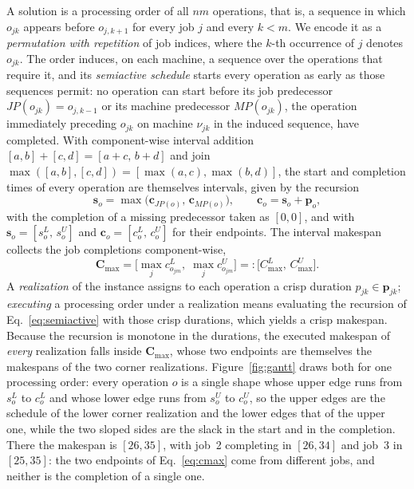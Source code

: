 \documentclass[preprint,authoryear,12pt]{elsarticle}
\newcommand{\Cmax}{\mathbf{C}_{\max}}
\theoremstyle{definition}
\theoremstyle{remark}
\begin{document}
A solution is a processing order of all $nm$ operations, that is, a
sequence in which $o_{jk}$ appears before $o_{j,k+1}$ for every job
$j$ and every $k<m$. We encode it as a \emph{permutation with
repetition} of job indices, where the $k$-th occurrence of $j$
denotes $o_{jk}$. The order induces, on each machine, a sequence over
the operations that require it, and its \emph{semiactive schedule}
starts every operation as early as those sequences permit: no
operation can start before its job predecessor $JP(o_{jk})=o_{j,k-1}$
or its machine predecessor $MP(o_{jk})$, the operation immediately
preceding $o_{jk}$ on machine $\nu_{jk}$ in the induced sequence,
have completed. With component-wise interval
addition $[a,b]+[c,d]=[a+c,\,b+d]$ and join
$\max([a,b],[c,d])=[\max(a,c),\max(b,d)]$, the start and completion
times of every operation are themselves intervals, given by the
recursion
\begin{equation}
\mathbf{s}_{o}=\max\!\big(\mathbf{c}_{JP(o)},\,\mathbf{c}_{MP(o)}\big),
\qquad
\mathbf{c}_{o}=\mathbf{s}_{o}+\mathbf{p}_{o},
\label{eq:semiactive}
\end{equation}
with the completion of a missing predecessor taken as $[0,0]$, and
with $\mathbf{s}_{o}=[s^{L}_{o},\,s^{U}_{o}]$ and
$\mathbf{c}_{o}=[c^{L}_{o},\,c^{U}_{o}]$ for their endpoints.
The interval makespan collects the job completions component-wise,
\begin{equation}
\Cmax=\Big[\max_{j} c^{L}_{o_{jm}},\;\max_{j} c^{U}_{o_{jm}}\Big]
=:\big[C^{L}_{\max},\,C^{U}_{\max}\big].
\label{eq:cmax}
\end{equation}
A \emph{realization} of the instance assigns to each operation a
crisp duration $p_{jk}\in\mathbf{p}_{jk}$; \emph{executing} a
processing order under a realization means evaluating the recursion
of Eq.~\eqref{eq:semiactive} with those crisp durations, which yields
a crisp makespan. Because the recursion is monotone in the durations,
the executed makespan of \emph{every} realization falls inside
$\Cmax$, whose two endpoints are themselves the makespans of the two
corner realizations. Figure~\ref{fig:gantt} draws both for one
processing order: every operation $o$ is a single shape whose upper
edge runs from $s^{L}_{o}$ to $c^{L}_{o}$ and whose lower edge runs
from $s^{U}_{o}$ to $c^{U}_{o}$, so the upper edges are the schedule
of the lower corner realization and the lower edges that of the
upper one, while the two sloped sides are the slack in the start and
in the completion. There the makespan is $[26,35]$, with job~2
completing in $[26,34]$ and job~3 in $[25,35]$: the two endpoints of
Eq.~\eqref{eq:cmax} come from different jobs, and neither is the
completion of a single one.
\end{document}
